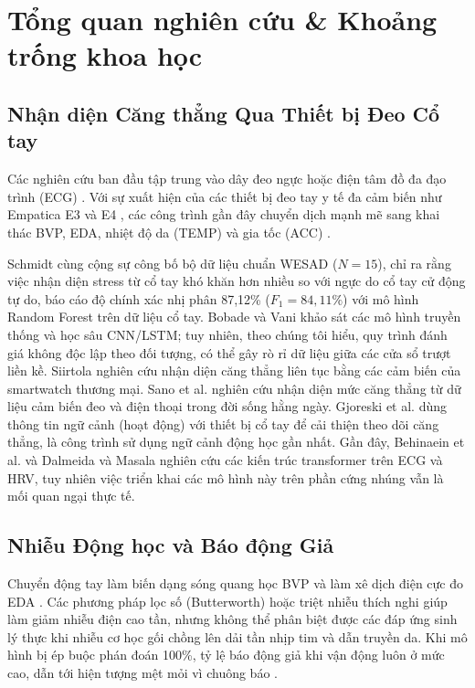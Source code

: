 \documentclass[conference]{IEEEtran}
\begin{document}
\section{Tổng quan nghiên cứu \& Khoảng trống khoa học}

\subsection{Nhận diện Căng thẳng Qua Thiết bị Đeo Cổ tay}
Các nghiên cứu ban đầu tập trung vào dây đeo ngực hoặc điện tâm đồ đa đạo trình (ECG) \cite{taskforce1996heart}. Với sự xuất hiện của các thiết bị đeo tay y tế đa cảm biến như Empatica E3 và E4 \cite{garbarino2014empatica, mccarthy2016validation}, các công trình gần đây chuyển dịch mạnh mẽ sang khai thác BVP, EDA, nhiệt độ da (TEMP) và gia tốc (ACC) \cite{can2019stress, gjoreski2016continuous}.

Schmidt cùng cộng sự \cite{schmidt2018wesad} công bố bộ dữ liệu chuẩn WESAD ($N=15$), chỉ ra rằng việc nhận diện stress từ cổ tay khó khăn hơn nhiều so với ngực do cổ tay cử động tự do, báo cáo độ chính xác nhị phân 87,12\% ($F_1 = 84,11\%$) với mô hình Random Forest trên dữ liệu cổ tay. Bobade và Vani \cite{bobade2020stress} khảo sát các mô hình truyền thống và học sâu CNN/LSTM; tuy nhiên, theo chúng tôi hiểu, quy trình đánh giá không độc lập theo đối tượng, có thể gây rò rỉ dữ liệu giữa các cửa sổ trượt liền kề. Siirtola \cite{siirtola2019continuous} nghiên cứu nhận diện căng thẳng liên tục bằng các cảm biến của smartwatch thương mại. Sano et al. \cite{sano2015recognizing} nghiên cứu nhận diện mức căng thẳng từ dữ liệu cảm biến đeo và điện thoại trong đời sống hằng ngày. Gjoreski et al. \cite{gjoreski2017monitoring} dùng thông tin ngữ cảnh (hoạt động) với thiết bị cổ tay để cải thiện theo dõi căng thẳng, là công trình sử dụng ngữ cảnh động học gần nhất. Gần đây, Behinaein et al. \cite{behinaein2021transformer} và Dalmeida và Masala \cite{dalmeida2021hrv} nghiên cứu các kiến trúc transformer trên ECG và HRV, tuy nhiên việc triển khai các mô hình này trên phần cứng nhúng vẫn là mối quan ngại thực tế.

\subsection{Nhiễu Động học và Báo động Giả}
Chuyển động tay làm biến dạng sóng quang học BVP và làm xê dịch điện cực đo EDA \cite{tamura2014wearable, zhang2014troika, schumm2008effect, taylor2015automatic, kleckner2018simple, elgendi2016optimal}. Các phương pháp lọc số (Butterworth) hoặc triệt nhiễu thích nghi \cite{zhang2014troika} giúp làm giảm nhiễu điện cao tần, nhưng không thể phân biệt được các đáp ứng sinh lý thực khi nhiễu cơ học gối chồng lên dải tần nhịp tim và dẫn truyền da. Khi mô hình bị ép buộc phán đoán 100\%, tỷ lệ báo động giả khi vận động luôn ở mức cao, dẫn tới hiện tượng mệt mỏi vì chuông báo \cite{sendelbach2013alarm}.
\end{document}
